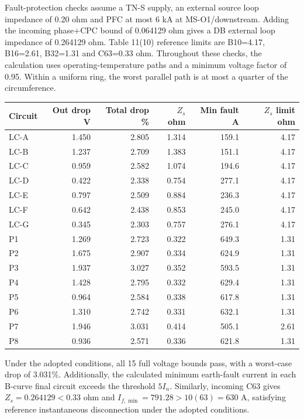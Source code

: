 Fault-protection checks assume a TN-S supply, an external source loop impedance of 0.20 ohm and PFC at most 6 kA at MS-O1/downstream.  Adding the incoming phase+CPC bound of 0.064129 ohm gives a DB external loop impedance of 0.264129 ohm. Table 11(10) reference limits are B10=4.17, B16=2.61, B32=1.31 and C63=0.33 ohm. Throughout these checks, the calculation uses operating-temperature paths and a minimum voltage factor of 0.95. Within a uniform ring, the worst parallel path is at most a quarter of the circumference.
\begin{longtable}{lrrrrr}\toprule
Circuit & Out drop V & Total drop \% & $Z_s$ ohm & Min fault A & $Z_s$ limit ohm\\\midrule\endhead

LC-A & 1.450 & 2.805 & 1.314 & 159.1 & 4.17 \\
LC-B & 1.237 & 2.709 & 1.383 & 151.1 & 4.17 \\
LC-C & 0.959 & 2.582 & 1.074 & 194.6 & 4.17 \\
LC-D & 0.422 & 2.338 & 0.754 & 277.1 & 4.17 \\
LC-E & 0.797 & 2.509 & 0.884 & 236.3 & 4.17 \\
LC-F & 0.642 & 2.438 & 0.853 & 245.0 & 4.17 \\
LC-G & 0.345 & 2.303 & 0.757 & 276.1 & 4.17 \\
P1 & 1.269 & 2.723 & 0.322 & 649.3 & 1.31 \\
P2 & 1.675 & 2.907 & 0.334 & 624.9 & 1.31 \\
P3 & 1.937 & 3.027 & 0.352 & 593.5 & 1.31 \\
P4 & 1.428 & 2.795 & 0.332 & 629.4 & 1.31 \\
P5 & 0.964 & 2.584 & 0.338 & 617.8 & 1.31 \\
P6 & 1.310 & 2.742 & 0.331 & 632.1 & 1.31 \\
P7 & 1.946 & 3.031 & 0.414 & 505.1 & 2.61 \\
P8 & 0.936 & 2.571 & 0.336 & 621.8 & 1.31 \\

\bottomrule\end{longtable}
Under the adopted conditions, all 15 full voltage bounds pass, with a worst-case drop of 3.031\%. Additionally, the calculated minimum earth-fault current in each B-curve final circuit exceeds the threshold $5I_n$. Similarly, incoming C63 gives $Z_s=0.264129<0.33$ ohm and $I_{f,\min}=791.28>10(63)=630$ A, satisfying reference instantaneous disconnection under the adopted conditions.
